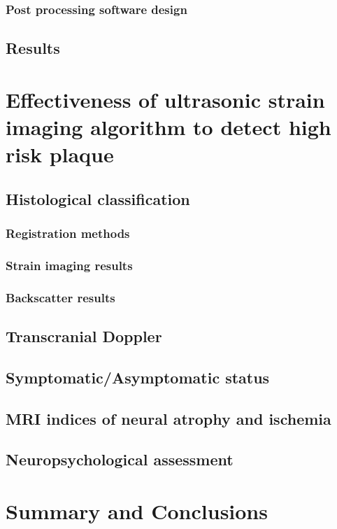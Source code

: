 \documentclass[12pt,twoside]{withesis}
\begin{document}
\subsection{Post processing software design}

\section{Results}


\chapter{Effectiveness of ultrasonic strain imaging algorithm to detect high
risk plaque}

\section{Histological classification}
\subsection{Registration methods}
\subsection{Strain imaging results}
\subsection{Backscatter results}

\section{Transcranial Doppler}

\section{Symptomatic/Asymptomatic status}

\section{MRI indices of neural atrophy and ischemia}

\section{Neuropsychological assessment}


\chapter{Summary and Conclusions}
\end{document}
